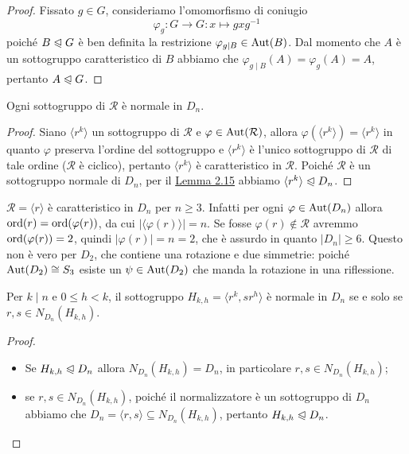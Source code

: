 \documentclass[11pt]{scrartcl}
\begin{document}
\begin{proof}
    Fissato $g \in G$, consideriamo l'omomorfismo di coniugio 
    \[
        \varphi_g : G\longrightarrow G : x\longmapsto gxg^{-1}
    \] poiché 
    $B\trianglelefteqslant G$ è ben definita la restrizione $\varphi_{g\mid B} \in \operatorname{Aut}(B)$. 
    Dal momento che $A$ è
    un sottogruppo caratteristico di $B$ abbiamo che $\varphi_{g\mid B}(A) =
    \varphi_g(A) = A$,
    pertanto $A \trianglelefteqslant G$.
\end{proof}


\begin{corollary}
    Ogni sottogruppo di $\mathcal{R}$ è normale in $D_n$.
\end{corollary}

\begin{proof}
    Siano $\langle r^k\rangle$ un sottogruppo di $\mathcal{R}$ e $\varphi
    \in \operatorname{Aut}(\mathcal{R})$, allora $\varphi(\langle r^k\rangle) = \langle r^k\rangle$
    in quanto $\varphi$ preserva l'ordine del sottogruppo e $\langle r^k\rangle$
    è l'unico sottogruppo di $\mathcal{R}$ di tale ordine ($\mathcal{R}$ è ciclico),
    pertanto $\langle r^k\rangle$
    è caratteristico in $\mathcal{R}$. Poiché $\mathcal{R}$ è un sottogruppo
    normale di $D_n$, per il \hyperref[lemma1.0]{Lemma 2.15}
    abbiamo $\langle r^k\rangle\trianglelefteqslant D_n$.
\end{proof}

\begin{remark}
    $\mathcal{R} = \langle r \rangle$ è caratteristico in $D_n$ per $n \geqslant 3$.
    Infatti per ogni $\varphi \in \operatorname{Aut}(D_n)$ allora
    $\operatorname{ord}(r) = \operatorname{ord}(\varphi(r))$, da cui $|\langle\varphi(r)\rangle| = n$.
    Se fosse $\varphi(r) \notin \mathcal{R}$ avremmo $\operatorname{ord}(\varphi(r)) = 2$, 
    quindi $|\varphi(r)| = n = 2$, che è assurdo in quanto $|D_n| \geqslant 6$.
    Questo non è vero per $D_2$, che contiene una rotazione e due
    simmetrie: poiché $\operatorname{Aut}(D_2) \cong S_3$ esiste un $\psi \in \operatorname{Aut}(D_2)$ che manda 
    la rotazione in una riflessione.
\end{remark}

\begin{corollary}
    Per $k\mid n$ e $0\leqslant h < k$, il sottogruppo $H_{k, h} = \langle r^k, sr^h\rangle$
    è normale in $D_n$ se e solo se $r, s \in N_{D_n}(H_{k, h})$.
\end{corollary}

\begin{proof}~
    \begin{itemize}
        \item Se $H_{k, h}\trianglelefteqslant D_n$ allora $N_{D_n}(H_{k, h}) = D_n$, 
        in particolare $r, s \in N_{D_n}(H_{k, h})$;
        \item se $r, s \in N_{D_n}(H_{k, h})$, poiché il normalizzatore è un
        sottogruppo di $D_n$ abbiamo che $D_n = \langle r, s\rangle \subseteq
        N_{D_n}(H_{k, h})$, pertanto $H_{k, h} \trianglelefteqslant D_n$.
    \end{itemize}
\end{proof}
\end{document}
